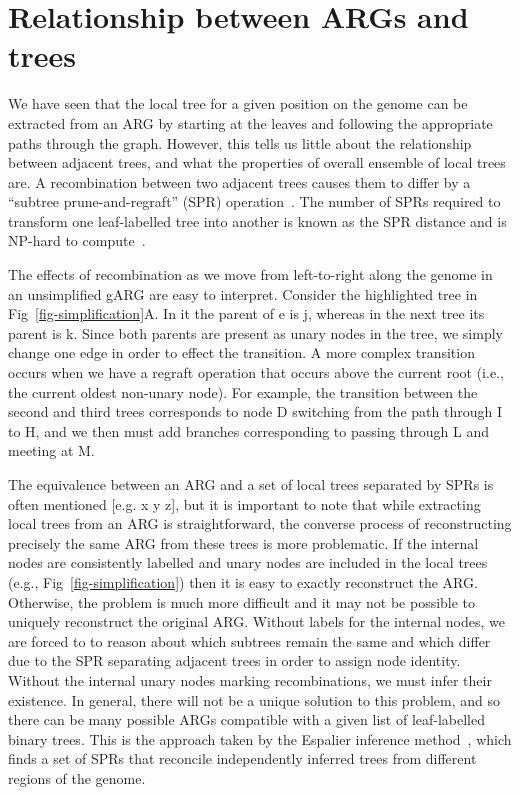 \documentclass{article}
\begin{document}
\section*{Relationship between ARGs and trees}

We have seen that the local tree for a given position on
the genome can be extracted from an ARG by starting at the
leaves and following the appropriate paths through the graph.
However, this tells us little about the relationship between
adjacent trees, and what the properties of overall ensemble of
local trees are.
A recombination between two adjacent trees causes them to
differ by a ``subtree prune-and-regraft'' (SPR)
operation~\citep{hein1990reconstructing,song2003on,song2006properties}.
The number of SPRs required to transform one leaf-labelled tree
into another is known as the SPR distance
and is NP-hard to
compute~\citep{hein1996complexity,allen2001subtree,bordewich2005computational}.

The effects of recombination as we move from left-to-right along
the genome in an unsimplified gARG are easy to interpret.
Consider the highlighted tree in Fig~\ref{fig-simplification}A.
In it the parent of \textsf{e} is \textsf{j}, whereas in the next tree
its parent is \textsf{k}. Since both parents are present as
unary nodes in the tree, we simply change one edge in
order to effect the transition.
A more complex transition occurs when we have a regraft operation
that occurs above the current root (i.e., the current oldest
non-unary node). For example, the transition between the
second and third trees corresponds to node D switching
from the path through I to H, and we then must add branches
corresponding to passing through L and meeting at M.

The equivalence between an ARG and a set of local trees
separated by SPRs is often mentioned [e.g. x y z], but
it is important to note that while extracting local
trees from an ARG is straightforward, the converse
process of reconstructing precisely the same ARG from
these trees is more problematic. If the internal
nodes are consistently labelled and unary nodes are
included in the local trees (e.g., Fig~\ref{fig-simplification})
then it is easy to exactly reconstruct the ARG.
Otherwise, the problem is much more difficult and it
may not be possible to uniquely reconstruct the original ARG.
Without labels for the internal nodes, we are forced to
to reason about which subtrees remain the same and which
differ due to the SPR separating adjacent trees in order to
assign node identity. Without the internal unary nodes marking
recombinations, we must infer their existence. In
general, there will not be a unique solution to this problem,
and so there can be many possible ARGs compatible with
a given list of leaf-labelled binary trees.
This is the approach taken by the Espalier inference
method~\citep{rasmussen2022espalier}, which finds a
set of SPRs that reconcile independently inferred
trees from different regions of the genome.
\end{document}
